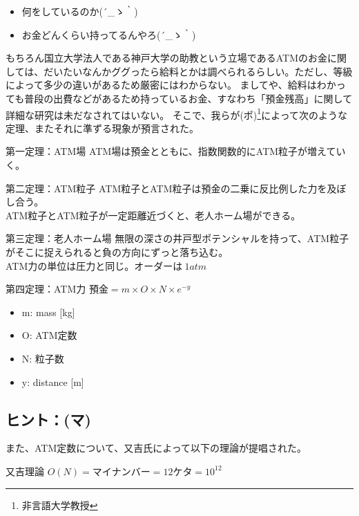 \begin{itemize}
\item 何をしているのか{\sf (´\_ゝ｀)}
\item お金どんくらい持ってるんやろ{\sf(´\_ゝ｀)}
\end{itemize}

もちろん国立大学法人である神戸大学の助教という立場であるATMのお金に関しては、だいたいなんかググったら給料とかは調べられるらしい。ただし、等級によって多少の違いがあるため厳密にはわからない。%
ましてや、給料はわかっても普段の出費などがあるため持っているお金、すなわち「預金残高」に関して詳細な研究は未だなされてはいない。
そこで、我らが(ポ)\footnote{非言語大学教授}によって次のような定理、またそれに準ずる現象が預言された。




\begin{itembox}[c]{第一定理：ATM場}
ATM場は預金とともに、指数関数的にATM粒子が増えていく。
\end{itembox}

\begin{itembox}[c]{第二定理：ATM粒子}
ATM粒子とATM粒子は預金の二乗に反比例した力を及ぼし合う。\\
ATM粒子とATM粒子が一定距離近づくと、老人ホーム場ができる。
\end{itembox}

\begin{itembox}[c]{第三定理：老人ホーム場}
無限の深さの井戸型ポテンシャルを持って、ATM粒子がそこに捉えられると負の方向にずっと落ち込む。\\
ATM力の単位は圧力と同じ。オーダーは$~1 atm$
\end{itembox}

\begin{itembox}[c]{第四定理：ATM力}
$預金=m\times O \times N \times e ^{ -y }$
\begin{itemize}
\item m: mass [kg]
\item O: ATM定数
\item N: 粒子数
\item y: distance [m]
\end{itemize}
\end{itembox}

\subsection{ヒント：(マ)}
\label{mata}
また、ATM定数について、又吉氏によって以下の理論が提唱された。
\begin{itembox}[c]{又吉理論}
$O(N) = マイナンバー = 12ケタ = 10^{12}$
\end{itembox}


